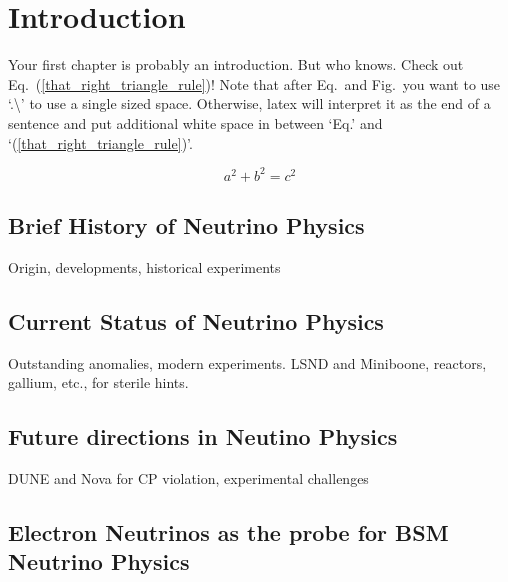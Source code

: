 
\chapter{Introduction}
Your first chapter is probably an introduction. But who knows. Check out Eq.\ (\ref{that_right_triangle_rule})!
Note that after Eq.\ and Fig.\ you want to use `.\textbackslash'  to use a single sized space. Otherwise,
latex will interpret it as the end of a sentence and put additional white space in between `Eq.' and 
`(\ref{that_right_triangle_rule})'.

\begin{equation}
a^2 + b^2 = c^2 \label{that_right_triangle_rule}
\end{equation}

\section{Brief History of Neutrino Physics}
Origin, developments, historical experiments

\section{Current Status of Neutrino Physics}
Outstanding anomalies, modern experiments.  LSND and Miniboone, reactors, gallium, etc., for sterile hints.

\section{Future directions in Neutino Physics}
DUNE and Nova for CP violation, experimental challenges

\section{Electron Neutrinos as the probe for BSM Neutrino Physics}